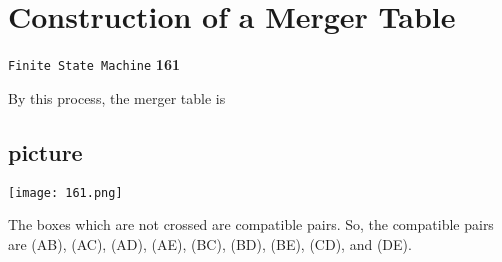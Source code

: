 \documentclass[9pt]{beamer}
\begin{document}
\begin{frame}
\section*{Construction of a Merger Table}
\begin{flushright}
 \texttt{Finite State Machine} \hspace*{1cm} \textbf{161}
\end{flushright}

\vspace*{0.5cm}
By this process, the merger table is\\

\vspace*{0.1cm}
\begin{center}
\section{picture}
\texttt{[image: 161.png]}
\end{center}

\vspace*{0.1cm}
\hspace*{0.5cm} The boxes which are not crossed are compatible pairs. So, the compatible pairs are (AB), (AC),
(AD), (AE), (BC), (BD), (BE), (CD), and (DE).\\
\end{frame}
\end{document}
